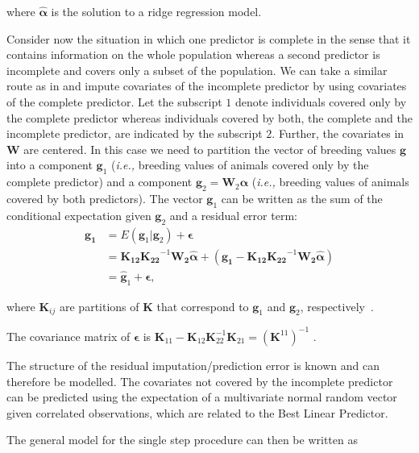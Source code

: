 \documentclass[12pt,titlepage]{article}
\begin{document}
where $\boldsymbol{\hat{\alpha}}$ is the solution to a ridge regression model.

Consider now the situation in which one predictor is complete in the sense that
it contains information on the whole population whereas a second predictor is
incomplete and covers only a subset of the population.
We can take a similar route as in  and impute covariates 
of the incomplete predictor by using covariates of the complete predictor.
Let the subscript $1$ denote individuals covered only by the complete
predictor whereas individuals covered by both, the complete and the
incomplete predictor, are indicated by the subscript $2$.
Further, the covariates in $\mathbf{W}$ are centered.
In this case we need to partition the vector of breeding values $\mathbf{g}$
into a component $\mathbf{g}_{1}$ (\textit{i.e.,} breeding values of animals 
covered only by the complete predictor) and a component 
$\mathbf{g}_{2} = \mathbf{W}_{2}\boldsymbol{\alpha}$ (\textit{i.e.,} breeding 
values of animals covered by both predictors).
The vector $\mathbf{g}_1$ can be written as the sum of the conditional 
expectation given $\mathbf{g}_2$ and a residual error term:
\begin{align} \label{eq:mrna1}
	\mathbf{g_1} &= E(\mathbf{g}_1|\mathbf{g}_2) + \boldsymbol{\epsilon} \\
	&= \mathbf{K_{12}}\mathbf{K_{22}}^{-1}\mathbf{W_2}\boldsymbol{\hat{\alpha}} + (\mathbf{g_1} - \mathbf{K_{12}}\mathbf{K_{22}}^{-1}\mathbf{W_2}\boldsymbol{\hat{\alpha}}) \\
	&= \mathbf{\hat{g}}_1 + \boldsymbol{\epsilon},
\end{align}

where $\mathbf{K}_{ij}$ are partitions of $\mathbf{K}$ that correspond to 
$\mathbf{g}_{1}$ and $\mathbf{g}_{2}$, respectively~\cite{Fernando2014}.

The covariance matrix of $\boldsymbol{\epsilon}$ is $\mathbf{K}_{11} - \mathbf{K}_{12}\mathbf{K}_{22}^{-1}\mathbf{K}_{21} = (\mathbf{K}^{11})^{-1}$
\cite{Legarra2009}.

The structure of the residual imputation/prediction error is known and can 
therefore be modelled.
The covariates not covered by the incomplete predictor can be predicted using 
the expectation of a multivariate normal random vector given correlated 
observations, which are related to the Best Linear Predictor.

The general model for the single step procedure can then be written as 
\end{document}

